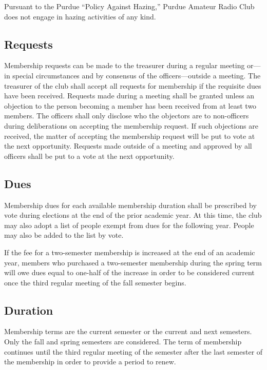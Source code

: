 \documentclass{article}
\begin{document}
Pursuant to the Purdue ``Policy Against Hazing,'' Purdue Amateur Radio Club does
not engage in hazing activities of any kind.

\subsection{Requests}

Membership requests can be made to the treasurer during a regular meeting
or---in special circumstances and by consensus of the officers---outside a
meeting. The treasurer of the club shall accept all requests for membership if
the requisite dues have been received. Requests made during a meeting shall be
granted unless an objection to the person becoming a member has been received
from at least two members. The officers shall only disclose who the objectors
are to non-officers during deliberations on accepting the membership request. If
such objections are received, the matter of accepting the membership request
will be put to vote at the next opportunity. Requests made outside of a meeting
and approved by all officers shall be put to a vote at the next opportunity.

\subsection{Dues}

Membership dues for each available membership duration shall be prescribed by
vote during elections at the end of the prior academic year. At this time, the
club may also adopt a list of people exempt from dues for the following year.
People may also be added to the list by vote.

If the fee for a two-semester membership is increased at the end of an academic
year, members who purchased a two-semester membership during the spring term
will owe dues equal to one-half of the increase in order to be considered
current once the third regular meeting of the fall semester begins.

\subsection{Duration}

Membership terms are the current semester or the current and next semesters.
Only the fall and spring semesters are considered. The term of membership
continues until the third regular meeting of the semester after the last
semester of the membership in order to provide a period to renew.
\end{document}
